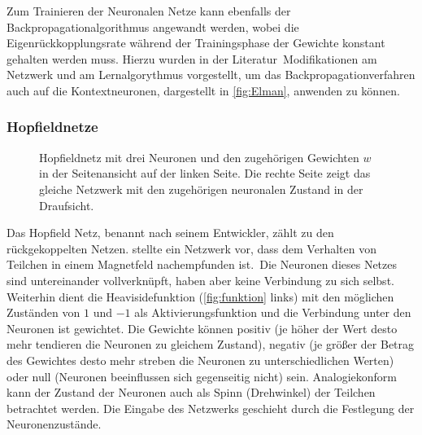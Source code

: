 Zum Trainieren der Neuronalen Netze kann ebenfalls der Backpropagationalgorithmus angewandt werden, wobei die Eigenrückkopplungsrate während der Trainingsphase der Gewichte konstant gehalten werden muss. Hierzu wurden in der Literatur\, Modifikationen am Netzwerk und am Lernalgorythmus vorgestellt, um das Backpropagationverfahren auch auf die Kontextneuronen, dargestellt in \autoref{fig:Elman}, anwenden zu können.


\subsubsection{Hopfieldnetze}%
\begin{figure}[!htb]
    \centering
        
    \caption[Darstellung eines Hopfieldnetzes]{Hopfieldnetz mit drei Neuronen und den zugehörigen Gewichten $w$ in der Seitenansicht auf der linken Seite. Die rechte Seite zeigt das gleiche Netzwerk mit den zugehörigen neuronalen Zustand in der Draufsicht.\,\protect\footnotemark{}}
    \label{fig:Hopfield}
\end{figure}
\addtocounter{footnote}{-1}     %
\addtocounter{Hfootnote}{-1}    %
\wrapfigfoot{}
Das Hopfield Netz, benannt nach seinem Entwickler, zählt zu den rückgekoppelten Netzen. \citet{HOPFIELD1986} stellte ein Netzwerk vor, dass dem Verhalten von Teilchen in einem Magnetfeld nachempfunden ist.\, Die Neuronen dieses Netzes sind untereinander vollverknüpft, haben aber keine Verbindung zu sich selbst. Weiterhin dient die Heavisidefunktion (\autoref{fig:funktion} links) mit den möglichen Zuständen von $1$ und $-1$ als Aktivierungsfunktion und die Verbindung unter den Neuronen ist gewichtet. Die Gewichte können positiv (je höher der Wert desto mehr tendieren die Neuronen zu gleichem Zustand), negativ (je größer der Betrag des Gewichtes desto mehr streben die Neuronen zu unterschiedlichen Werten) oder null (Neuronen beeinflussen sich gegenseitig nicht) sein. Analogiekonform kann der Zustand der Neuronen auch als Spinn (Drehwinkel) der Teilchen betrachtet werden. Die Eingabe des Netzwerks geschieht durch die Festlegung der Neuronenzustände. 

